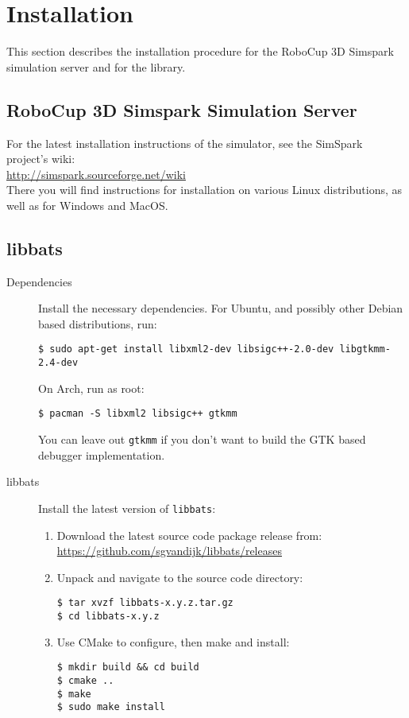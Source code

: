 \chapter{Installation}
\label{chInstallation}

This section describes the installation procedure for the RoboCup 3D
Simspark simulation server and for the \libbats library.

\section{RoboCup 3D Simspark Simulation Server}

For the latest installation instructions of the simulator, see the SimSpark project's wiki: \\
\url{http://simspark.sourceforge.net/wiki}\\
There you will find instructions for installation on various Linux
distributions, as well as for Windows and MacOS.

\section{libbats}

\begin{description}
\item[Dependencies] Install the necessary dependencies. For Ubuntu,
  and possibly other Debian based distributions, run:
\begin{verbatim}
$ sudo apt-get install libxml2-dev libsigc++-2.0-dev libgtkmm-2.4-dev
\end{verbatim}
  On Arch, run as root:
\begin{verbatim}
$ pacman -S libxml2 libsigc++ gtkmm
\end{verbatim}
  You can leave out {\tt gtkmm} if you don't want to build the GTK
  based debugger implementation.
\item[libbats] Install the latest version of {\tt libbats}:
  \begin{enumerate}
  \item Download the latest source code package release from: \\
    \url{https://github.com/sgvandijk/libbats/releases}
  \item Unpack and navigate to the source code directory:
\begin{verbatim}
$ tar xvzf libbats-x.y.z.tar.gz
$ cd libbats-x.y.z
\end{verbatim}
  \item Use CMake to configure, then make and install:
\begin{verbatim}
$ mkdir build && cd build
$ cmake ..
$ make
$ sudo make install
\end{verbatim}
  \end{enumerate}
\end{description}

